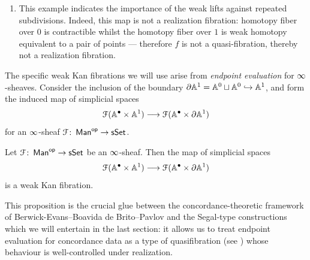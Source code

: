 \begin{example}
\begin{enumerate}
\begin{equation}
\begin{tikzcd}[ampersand replacement=\&]
            {} \& \bullet \\
            \& \bullet \& \bullet \& \bullet \& \bullet \& \bullet
            \arrow[from=1-2, to=1-3]
            \arrow[from=1-2, to=2-2]
            \arrow[from=1-6, to=1-3]
            \arrow[from=3-2, to=2-2]
            \arrow[from=3-2, to=3-3]
            \arrow[from=3-4, to=3-3]
            \arrow[from=3-4, to=3-5]
            \arrow[from=3-6, to=3-5]
        \end{tikzcd}
        \end{equation} 
        then any homotopy lifting $\Delta[2] \longra \Delta[1]$ would fail to be vertical.
        \item This example indicates the importance of the weak lifts against repeated subdivisions. Indeed, this map is not a realization fibration: homotopy fiber over $0$ is contractible whilst the homotopy fiber over $1$ is weak homotopy equivalent to a pair of points — therefore $f$ is not a quasi-fibration, thereby not a realization fibration.
    \end{enumerate}
\end{example}


The specific weak Kan fibrations we will use arise from \emph{endpoint
evaluation} for $\operatorname{\infty}$-sheaves. Consider the inclusion of the boundary
$\partial \mathbb A^1 = \mathbb A^0\sqcup \mathbb A^0 \hookrightarrow \mathbb A^1$, and form the induced map of
simplicial spaces
\begin{equation}
  \mathcal F(\mathbb A^{\bullet}\times \mathbb A^{1}) \longrightarrow
  \mathcal F(\mathbb A^{\bullet}\times \partial \mathbb A^{1})
\end{equation}
for an $\operatorname{\infty}$-sheaf $\mathcal F\colon\operatorname{\sf Man}^{\mathsf{op}}\to\operatorname{\sf sSet}$.

\begin{proposition}\label{ch3:: prop: weak-kan-endpoints}\cite[Proposition~4.2]{BBEP24}
  Let $\mathcal F\colon\operatorname{\sf Man}^{\mathsf{op}}\to\operatorname{\sf sSet}$ be an $\operatorname{\infty}$-sheaf. Then the map of
  simplicial spaces
  \begin{equation}
    \mathcal F(\mathbb A^{\bullet}\times \mathbb A^{1}) \longrightarrow
    \mathcal F(\mathbb A^{\bullet}\times \partial \mathbb A^{1})
  \end{equation}
  is a weak Kan fibration.
\end{proposition}

This proposition is the crucial glue between the concordance-theoretic framework of Berwick-Evans--Boavida de Brito--Pavlov and the Segal-type constructions which we will entertain in the last section: it allows us to treat endpoint evaluation for concordance data as a type of quasifibration (see \cite{May90}) whose behaviour is well-controlled under realization.

